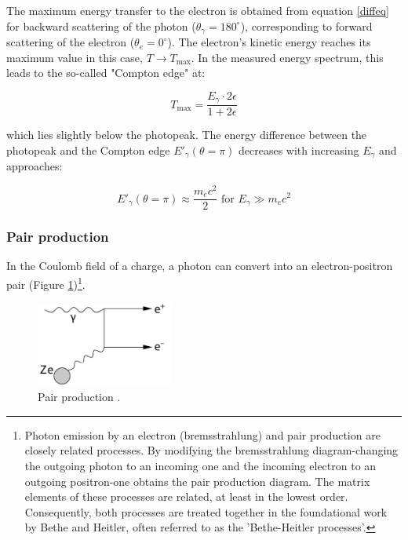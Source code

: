 The maximum energy transfer to the electron is obtained 
from equation \ref{diffeq} for backward scattering of the 
photon ($\theta_\gamma = 180^\circ$), corresponding to 
forward scattering of the electron ($\theta_e = 0^\circ$). 
The electron's kinetic energy reaches its maximum value in 
this case, $T \rightarrow T_{\text{max}}$. In the measured 
energy spectrum, this leads to the so-called "Compton edge" at:

\begin{equation}
T_{\text{max}} = \frac{E_\gamma \cdot 2\epsilon}{1 + 2\epsilon}
\end{equation}

which lies slightly below the photopeak. The energy difference 
between the photopeak and the Compton edge $E'_\gamma(\theta = \pi)$ 
decreases with increasing $E_\gamma$ and approaches:

\begin{equation}
E'_\gamma(\theta = \pi) \approx \frac{m_e c^2}{2} \text{ for } E_\gamma \gg m_e c^2
\end{equation}

\subsubsection{Pair production}
In the Coulomb field of a charge, a photon can 
convert into an electron-positron pair (Figure 
\ref{fig:pprod})\footnote{Photon emission by an 
electron (bremsstrahlung) and pair production are closely 
related processes. By modifying the bremsstrahlung diagram-changing 
the outgoing photon to an incoming one and the incoming electron to 
an outgoing positron-one obtains the pair production 
diagram. The matrix elements of these processes are 
related, at least in the lowest order. Consequently, both 
processes are treated together in the foundational work by 
Bethe and Heitler, often referred to as the 'Bethe-Heitler processes'.}.

\begin{figure}[!h]
    \centering
    \includegraphics[width=0.4\textwidth]{figures/png/Screenshot_20240812_204755.png}
    \caption[Pair production]{Pair production \cite{kola}.}
    \label{fig:pprod}
\end{figure}

